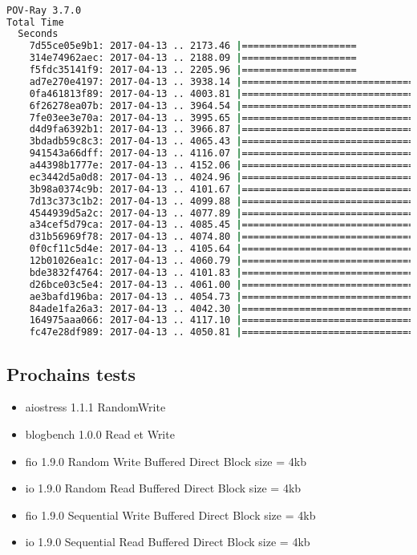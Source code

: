 \documentclass[french]{article}
\begin{document}
\begin{lstlisting}[language=bash,caption={POV-Ray 3.7.0}]

POV-Ray 3.7.0
Total Time
  Seconds
    7d55ce05e9b1: 2017-04-13 .. 2173.46 |====================
    314e74962aec: 2017-04-13 .. 2188.09 |====================
    f5fdc35141f9: 2017-04-13 .. 2205.96 |====================
    ad7e270e4197: 2017-04-13 .. 3938.14 |====================================
    0fa461813f89: 2017-04-13 .. 4003.81 |=====================================
    6f26278ea07b: 2017-04-13 .. 3964.54 |====================================
    7fe03ee3e70a: 2017-04-13 .. 3995.65 |=====================================
    d4d9fa6392b1: 2017-04-13 .. 3966.87 |====================================
    3bdadb59c8c3: 2017-04-13 .. 4065.43 |=====================================
    941543a66dff: 2017-04-13 .. 4116.07 |======================================
    a44398b1777e: 2017-04-13 .. 4152.06 |======================================
    ec3442d5a0d8: 2017-04-13 .. 4024.96 |=====================================
    3b98a0374c9b: 2017-04-13 .. 4101.67 |======================================
    7d13c373c1b2: 2017-04-13 .. 4099.88 |======================================
    4544939d5a2c: 2017-04-13 .. 4077.89 |=====================================
    a34cef5d79ca: 2017-04-13 .. 4085.45 |=====================================
    d31b56969f78: 2017-04-13 .. 4074.80 |=====================================
    0f0cf11c5d4e: 2017-04-13 .. 4105.64 |======================================
    12b01026ea1c: 2017-04-13 .. 4060.79 |=====================================
    bde3832f4764: 2017-04-13 .. 4101.83 |======================================
    d26bce03c5e4: 2017-04-13 .. 4061.00 |=====================================
    ae3bafd196ba: 2017-04-13 .. 4054.73 |=====================================
    84ade1fa26a3: 2017-04-13 .. 4042.30 |=====================================
    164975aaa066: 2017-04-13 .. 4117.10 |======================================
    fc47e28df989: 2017-04-13 .. 4050.81 |=====================================

\end{lstlisting}
\newpage
\subsection{Prochains tests}
\begin{itemize}
\item aiostress 1.1.1 RandomWrite
\item blogbench 1.0.0 Read et Write
\item fio 1.9.0 Random Write Buffered Direct Block size = 4kb
\item io 1.9.0 Random Read Buffered Direct Block size = 4kb
\item fio 1.9.0 Sequential Write Buffered Direct Block size = 4kb
\item io 1.9.0 Sequential Read Buffered Direct Block size = 4kb
\end{itemize}

\newpage
\end{document}

